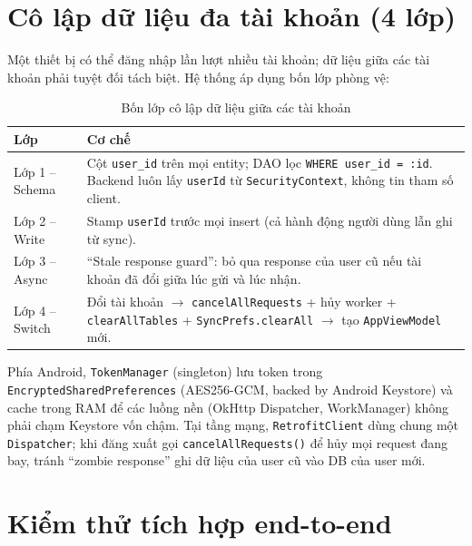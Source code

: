 \documentclass[11pt,a4paper]{article}
\begin{document}
\section{Cô lập dữ liệu đa tài khoản (4 lớp)}
\label{sec:isolation}

Một thiết bị có thể đăng nhập lần lượt nhiều tài khoản; dữ liệu giữa các tài khoản phải
tuyệt đối tách biệt. Hệ thống áp dụng bốn lớp phòng vệ:

\begin{table}[ht]
\centering
\caption{Bốn lớp cô lập dữ liệu giữa các tài khoản}
\label{tab:isolation}
\begin{tabular}{@{}lp{}@{}}
\toprule
\textbf{Lớp} & \textbf{Cơ chế} \\
\midrule
Lớp 1 -- Schema & Cột \texttt{user\_id} trên mọi entity; DAO lọc \texttt{WHERE user\_id = :id}. Backend luôn lấy \texttt{userId} từ \texttt{SecurityContext}, không tin tham số client. \\
Lớp 2 -- Write  & Stamp \texttt{userId} trước mọi insert (cả hành động người dùng lẫn ghi từ sync). \\
Lớp 3 -- Async  & ``Stale response guard'': bỏ qua response của user cũ nếu tài khoản đã đổi giữa lúc gửi và lúc nhận. \\
Lớp 4 -- Switch & Đổi tài khoản $\rightarrow$ \texttt{cancelAllRequests} + hủy worker + \texttt{clearAllTables} + \texttt{SyncPrefs.clearAll} $\rightarrow$ tạo \texttt{AppViewModel} mới. \\
\bottomrule
\end{tabular}
\end{table}

\noindent Phía Android, \texttt{TokenManager} (singleton) lưu token trong
\texttt{EncryptedSharedPreferences} (AES256-GCM, backed by Android Keystore) và cache trong RAM
để các luồng nền (OkHttp Dispatcher, WorkManager) không phải chạm Keystore vốn chậm. Tại tầng
mạng, \texttt{RetrofitClient} dùng chung một \texttt{Dispatcher}; khi đăng xuất gọi
\texttt{cancelAllRequests()} để hủy mọi request đang bay, tránh ``zombie response'' ghi dữ liệu
của user cũ vào DB của user mới.

\section{Kiểm thử tích hợp end-to-end}
\label{sec:testing}
\end{document}
